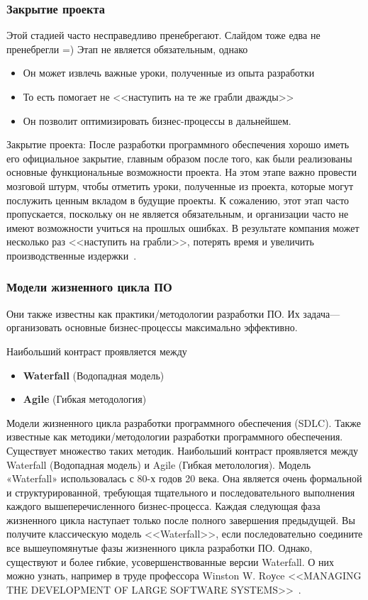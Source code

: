 \documentclass{../industrial-development}
\begin{document}
\begin{frame} \frametitle{Закрытие проекта}
Этой стадией часто \alert{несправедливо} пренебрегают. Слайдом тоже едва не пренебрегли =) Этап не является обязательным, однако
\begin{itemize}
\item Он может извлечь важные уроки, полученные из опыта разработки 
\item То есть помогает не <<наступить на те же грабли дважды>>
\item Он позволит оптимизировать бизнес-процессы в дальнейшем.
\end{itemize}
\end{frame}
\lecturenotes
Закрытие проекта:
После разработки программного обеспечения хорошо иметь его официальное закрытие, главным образом после того, как были реализованы основные функциональные возможности проекта. На этом этапе важно провести мозговой штурм, чтобы отметить уроки, полученные из проекта, которые могут послужить ценным вкладом в будущие проекты. К сожалению, этот этап часто пропускается, поскольку он не является обязательным, и организации часто не имеют возможности учиться на прошлых ошибках. В результате компания может несколько раз <<наступить на грабли>>, потерять время и увеличить производственные издержки~\cite{SDLC}.
	

\begin{frame} \frametitle{Модели жизненного цикла ПО}
Они также известны как практики/методологии разработки ПО. Их задача---организовать основные бизнес-процессы максимально эффективно. 
\begin{block}{Наибольший контраст проявляется между }  
\begin{itemize}
\item \textbf{Waterfall} (Водопадная модель)
\item \textbf{Agile} (Гибкая методология)
\end{itemize}
\end{block}
\end{frame}
\lecturenotes
Модели жизненного цикла разработки программного обеспечения (SDLC). Также известные как методики/методологии разработки программного обеспечения.
Существует множество таких методик. Наибольший контраст проявляется между Waterfall (Водопадная модель) и Agile (Гибкая метолология).
Модель «Waterfall» использовалась с 80-х годов 20 века. Она является очень формальной и структурированной, требующая тщательного и последовательного выполнения каждого вышеперечисленного бизнес-процесса. Каждая следующая фаза жизненного цикла наступает только после полного завершения предыдущей. Вы получите классическую модель <<Waterfall>>, если последовательно соедините все вышеупомянутые фазы жизненного цикла разработки ПО. Однако, существуют и более гибкие, усовершенствованные версии Waterfall. О них можно узнать, например в труде профессора Winston W. Roуce <<MANAGING THE DEVELOPMENT OF LARGE SOFTWARE SYSTEMS>>~\cite{Winston}.
\end{document}
